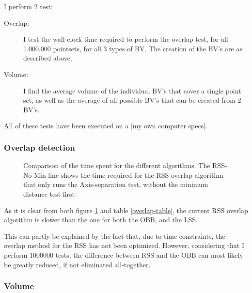 I perform 2 test: 
\begin{description}
\item[Overlap:] I test the wall clock time required to perform the overlap test,
  for all 1.000.000 pointsets, for all 3 types of BV. The creation of the BV's are as described above.  
\item[Volume:] I find the average volume of the individual BV's that cover a single point set, as well as the average of all possible BV's that can be created from 2 BV's. 
\end{description}

All of these tests have been executed on a [my own computer specs].

\subsubsection{Overlap detection}

\begin{figure}
\caption{\label{overlap-OBB_RSS_RSS-No-Min_LSS}Comparison of the time spent for the different algorithms. The RSS-No-Min line shows the time required for the RSS overlap algorithm that only runs the Axis-separation test, without the minimum distance test first}
\end{figure}

\begin{table}

\caption{\label{overlap-table}The table of the time used for the
  different overlaps checks. All of the times are in wall clock time seconds. The
  check reading ``RSS no-min'' is a RSS overlap check that is only run
with the axis separation test, and no minimum distance check first}
\end{table}

As it is clear from both figure \ref{overlap-OBB_RSS_RSS-No-Min_LSS} and table \ref{overlap-table}, the current RSS overlap algorithm is slower than the one for both the OBB, and the LSS. 

This can partly be explained by the fact that, due to time constraints,
the overlap method for the RSS has not been optimized. However, considering that I perform 1000000 tests, the difference between RSS and the OBB can most likely be greatly reduced, if not eliminated all-together.

\subsubsection{Volume}
\label{volume-label}
\begin{table}

\caption{\label{volume-table} The average volume needed by the
  different BV to contain the points. The first row of values are the average
  volumes for each of the 2000 different BV that are produced, while
  the second row of values are the average volumes of the 1.000.000
  different combinations of BV's.}
\end{table}

